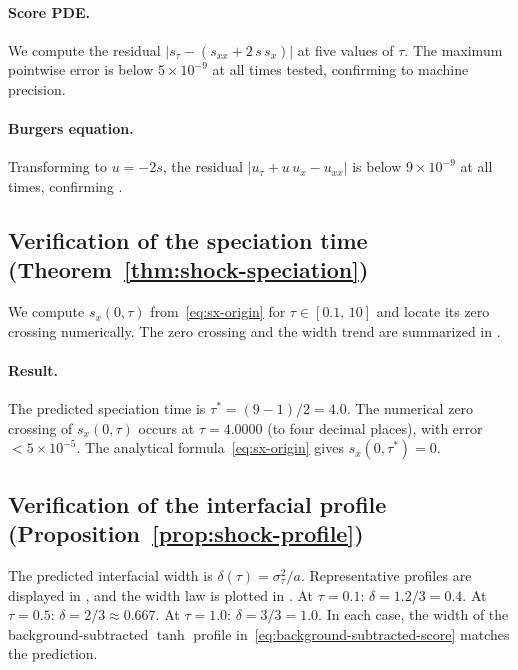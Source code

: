 \documentclass[11pt]{article}
\begin{document}
\paragraph{Score PDE.}
We compute the residual $|s_\tau - (s_{xx} + 2\,s\,s_x)|$ at five values of $\tau$.
The maximum pointwise error is below $5 \times 10^{-9}$ at all times tested, confirming  to machine precision.

\paragraph{Burgers equation.}
Transforming to $u = -2s$, the residual $|u_\tau + u\,u_x - u_{xx}|$ is below $9 \times 10^{-9}$ at all times, confirming .

\subsection{Verification of the speciation time (Theorem~\ref{thm:shock-speciation})}\label{sec:exp:speciation}

We compute $s_x(0,\tau)$ from~\eqref{eq:sx-origin} for $\tau \in [0.1,\, 10]$ and locate its zero crossing numerically.
The zero crossing and the width trend are summarized in .

\paragraph{Result.}
The predicted speciation time is $\tau^\ast = (9 - 1)/2 = 4.0$.
The numerical zero crossing of $s_x(0,\tau)$ occurs at $\tau = 4.0000$ (to four decimal places), with error $< 5 \times 10^{-5}$.
The analytical formula~\eqref{eq:sx-origin} gives $s_x(0,\tau^\ast) = 0$.

\subsection{Verification of the interfacial profile (Proposition~\ref{prop:shock-profile})}\label{sec:exp:profile}

The predicted interfacial width is $\delta(\tau) = \sigma_\tau^2/a$.
Representative profiles are displayed in , and the width law is plotted in .
At $\tau = 0.1$: $\delta = 1.2/3 = 0.4$.
At $\tau = 0.5$: $\delta = 2/3 \approx 0.667$.
At $\tau = 1.0$: $\delta = 3/3 = 1.0$.
In each case, the width of the background-subtracted $\tanh$ profile in~\eqref{eq:background-subtracted-score} matches the prediction.
\end{document}
